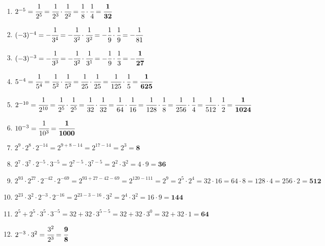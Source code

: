 \documentclass[a4paper,12pt]{article} %
\begin{document}
\begin{enumerate}[label=\alph*)]

  \item \(2^{-5} = \cfrac{1}{2^5} = \cfrac{1}{2^3} \cdot \cfrac{1}{2^2} = \cfrac{1}{8} \cdot \cfrac{1}{4} =
    \mathbf{\cfrac{1}{32}}\) %

  \item \((-3)^{-4} = -\cfrac{1}{3^4} = -\cfrac{1}{3^2} \cdot \cfrac{1}{3^2} =
    -\cfrac{1}{9} \cdot \cfrac{1}{9} = -\cfrac{1}{81}\) %

  \item \((-3)^{-3} = -\cfrac{1}{3^3} = -\cfrac{1}{3^2} \cdot \cfrac{1}{3^1} =
    -\cfrac{1}{9} \cdot \cfrac{1}{3} = \mathbf{-\cfrac{1}{27}}\) %

  \item \(5^{-4} = \cfrac{1}{5^4} = \cfrac{1}{5^2} \cdot \cfrac{1}{5^2} =
    \cfrac{1}{25} \cdot \cfrac{1}{25} = \cfrac{1}{125} \cdot \cfrac{1}{5} = \mathbf{\cfrac{1}{625}}\) %

  \item \(2^{-10} = \cfrac{1}{2^{10}} = \cfrac{1}{2^5} \cdot \cfrac{1}{2^5} =
    \cfrac{1}{32} \cdot \cfrac{1}{32} = \cfrac{1}{64} \cdot \cfrac{1}{16} = \cfrac{1}{128} \cdot \cfrac{1}{8} =
    \cfrac{1}{256} \cdot \cfrac{1}{4} = \cfrac{1}{512} \cdot \cfrac{1}{2} = \mathbf{\cfrac{1}{1024}}\) %

  \item \(10^{-3} = \cfrac{1}{10^{3}} = \mathbf{\cfrac{1}{1000}}\) %

  \item \(2^9 \cdot 2^8 \cdot 2^{-14} = 2^{9 + 8 - 14} = 2^{17 - 14} = 2^3 = \mathbf{8}\) %

  \item \(2^7 \cdot 3^7 \cdot 2^{-5} \cdot 3^{-5} = 2^{7 - 5} \cdot 3^{7 - 5} =
    2^2 \cdot 3^2 = 4 \cdot 9 = \mathbf{36}\) %

  \item \(2^{93} \cdot 2^{27} \cdot 2^{-42} \cdot 2^{-69} = 2^{93 + 27 - 42 - 69} =
    2^{120 - 111} = 2^9 = 2^5 \cdot 2^4 = 32 \cdot 16 = 64 \cdot 8 = 128 \cdot 4 = 256 \cdot 2 = \mathbf{512}\) %

  \item \(2^{23} \cdot 3^2 \cdot 2^{-3} \cdot 2^{-16} = 2^{23 - 3 - 16} \cdot 3^2 =
    2^4 \cdot 3^2 = 16 \cdot 9 = \mathbf{144}\) %

  \item \(2^5 + 2^5 \cdot 3^5 \cdot 3^{-5} = 32 + 32 \cdot 3^{5 - 5} = 32 + 32 \cdot 3^0 =
    32 + 32 \cdot 1 = \mathbf{64}\) %

  \item \(2^{-3} \cdot 3^2 = \cfrac{3^2}{2^3} = \mathbf{\cfrac{9}{8}}\) %

\end{enumerate}
\end{document}
